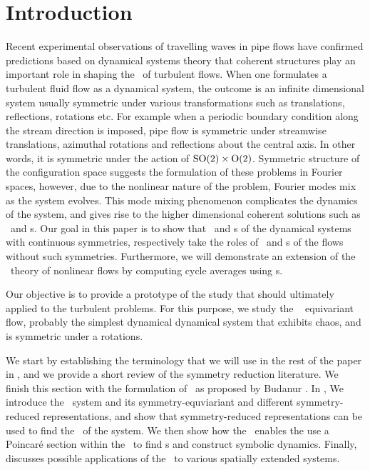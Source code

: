 \section{Introduction}
\label{s:intro}

Recent experimental observations of travelling waves in pipe flows have confirmed predictions based on dynamical systems theory that coherent structures play an important role in shaping the \statesp\ of turbulent flows. When one formulates a turbulent fluid flow as a dynamical system, the outcome is an infinite dimensional system usually symmetric under various transformations such as translations, reflections, rotations etc. For example when a periodic boundary condition along the stream direction is imposed, pipe flow is symmetric under streamwise translations, azimuthal rotations and reflections about the central axis. In other words, it is symmetric under the action of $\textrm{SO}(2) \times \textrm{O}(2)$. Symmetric structure of the configuration space suggests the formulation of these problems in Fourier spaces, however, due to the nonlinear nature of the problem, Fourier modes mix as the system evolves. This mode mixing phenomenon complicates the dynamics of the system, and gives rise to the higher dimensional coherent solutions such as \reqva\ and \rpo s. Our goal in this paper is to show that \reqva\ and \rpo s of the dynamical systems with continuous symmetries, respectively take the roles of \eqva\ and \po s of the flows without such symmetries. Furthermore, we will demonstrate an extension of the \po\ theory of nonlinear flows by computing cycle averages using \rpo s.

Our objective is to provide a prototype of the study that should ultimately applied to the turbulent problems. For this purpose, we study the \twoMode\  equivariant flow, probably the simplest dynamical dynamical system that exhibits chaos, and is symmetric under a  rotations.

We start by establishing the terminology that we will use in the rest of the paper in , and we provide a short review of the symmetry reduction literature. We finish this section with the formulation of \mslices\ as proposed by Budanur \etal{}. In , We introduce the \twomode\ system and its symmetry-equviariant and different symmetry-reduced representations, and show that symmetry-reduced representations can be used to find the \reqva\ of the system. We then show how the \mslices\ enables the use a Poincar\'e section within the \slice\ to find  \rpo s and construct symbolic dynamics.
Finally,  discusses possible applications of the \mslices\ to various spatially extended systems.
